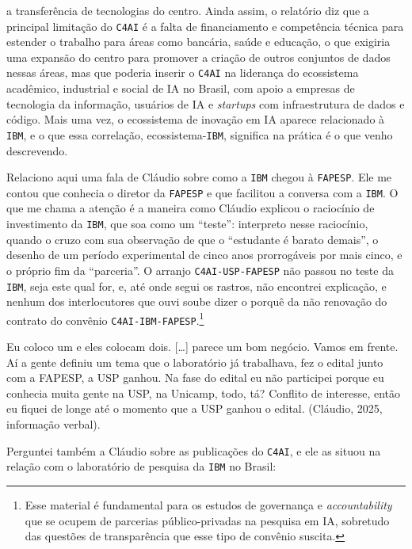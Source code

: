 a transferência de tecnologias do centro. Ainda assim, o relatório diz que a principal limitação do \texttt{C4AI} é a falta de financiamento e competência técnica para estender o trabalho para áreas como bancária, saúde e educação, o que exigiria uma expansão do centro para promover a criação de outros conjuntos de dados nessas áreas, mas que poderia inserir o \texttt{C4AI} na liderança do ecossistema acadêmico, industrial e social de IA no Brasil, com apoio a empresas de tecnologia da informação, usuários de IA e \emph{startups} com infraestrutura de dados e código. Mais uma vez, o ecossistema de inovação em IA aparece relacionado à \texttt{IBM}, e o que essa correlação, ecossistema-\texttt{IBM}, significa na prática é o que venho descrevendo.

Relaciono aqui uma fala de Cláudio sobre como a \texttt{IBM} chegou à \texttt{FAPESP}. Ele me contou que conhecia o diretor da \texttt{FAPESP} e que facilitou a conversa com a \texttt{IBM}. O que me chama a atenção é a maneira como Cláudio explicou o raciocínio de investimento da \texttt{IBM}, que soa como um \enquote{teste}: interpreto nesse raciocínio, quando o cruzo com sua observação de que o \enquote{estudante é barato demais}, o desenho de um período experimental de cinco anos prorrogáveis por mais cinco, e o próprio fim da \enquote{parceria}. O arranjo \texttt{C4AI-USP-FAPESP} não passou no teste da \texttt{IBM}, seja este qual for, e, até onde segui os rastros, não encontrei explicação, e nenhum dos interlocutores que ouvi soube dizer o porquê da não renovação do contrato do convênio \texttt{C4AI-IBM-FAPESP}.\footnote{Esse material é fundamental para os estudos de governança e \textit{accountability} que se ocupem de parcerias público-privadas na pesquisa em IA, sobretudo das questões de transparência que esse tipo de convênio suscita.}

\begin{citacaoabnt}
Eu coloco um e eles colocam dois. [\ldots{}] parece um bom negócio. Vamos em frente. Aí a gente definiu um tema que o laboratório já trabalhava, fez o edital junto com a FAPESP, a USP ganhou. Na fase do edital eu não participei porque eu conhecia muita gente na USP, na Unicamp, todo, tá? Conflito de interesse, então eu fiquei de longe até o momento que a USP ganhou o edital. (Cláudio, 2025, informação verbal).
\end{citacaoabnt}

Perguntei também a Cláudio sobre as publicações do \texttt{C4AI}, e ele as situou na relação com o laboratório de pesquisa da \texttt{IBM} no Brasil:

